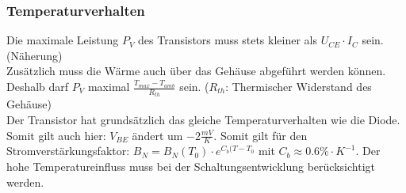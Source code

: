 \newpage		
	\subsubsection{Temperaturverhalten}
		Die maximale Leistung $P_V$ des Transistors muss stets kleiner als 
		$U_{CE} \cdot I_C$ sein. (Näherung) \\
		Zusätzlich muss die Wärme auch über das Gehäuse abgeführt werden können. Deshalb
		darf $P_V$ maximal $\frac{T_{max}-T_{amb}}{R_{th}}$ sein. ($R_{th}$: Thermischer
		Widerstand des Gehäuse) \\
		Der Transistor hat grundsätzlich das gleiche Temperaturverhalten wie die Diode. Somit
		gilt auch hier: $V_{BE}$ ändert um $-2\frac{mV}{K}$. Somit gilt für den
		Stromverstärkungsfaktor: $B_N=B_N(T_0)\cdot e^{C_b(T-T_0}$ mit 
		$C_b \approx 0.6\% \cdot K^{-1}$. Der hohe Temperatureinfluss muss bei der
		Schaltungsentwicklung berücksichtigt werden. \\
		
